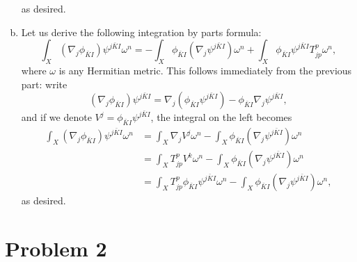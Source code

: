 \documentclass{../mathnotes}
\begin{document}
\begin{enumerate}[(a)]
        as desired.
    \item Let us derive the following integration by parts formula:
        \[\int_X(\nabla_j\phi_{\bar KI})\psi^{j\bar KI}\omega^n=-\int_X\phi_{\bar KI}(\nabla_j\psi^{j\bar KI})\omega^n+\int_X\phi_{\bar KI}\psi^{j\bar KI}T^p_{jp}\omega^n,\]
        where $\omega$ is any Hermitian metric. This follows immediately from the previous part: write
        \[(\nabla_j\phi_{\bar KI})\psi^{j\bar KI}=\nabla_j(\phi_{\bar KI}\psi^{j\bar KI})-\phi_{\bar KI}\nabla_j\psi^{j\bar KI},\]
        and if we denote $V^j=\phi_{\bar KI}\psi^{j\bar KI}$, the integral on the left becomes
        \begin{align*}
            \int_X(\nabla_j\phi_{\bar KI})\psi^{j\bar KI}\omega^n&=\int_X \nabla_jV^j\omega^n-\int_X \phi_{\bar KI}(\nabla_j\psi^{j\bar KI})\omega^n\\
            &=\int_X T^p_{jp}V^k\omega^n-\int_X \phi_{\bar KI}(\nabla_j\psi^{j\bar KI})\omega^n\\
            &=\int_X T^p_{jp}\phi_{\bar KI}\psi^{j\bar KI}\omega^n-\int_X \phi_{\bar KI}(\nabla_j\psi^{j\bar KI})\omega^n,
        \end{align*}
        as desired.
\end{enumerate}

\section*{Problem 2}
\end{document}
